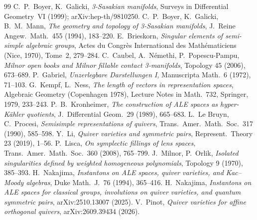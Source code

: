 \documentclass[11pt]{article}
\theoremstyle{definition}
\theoremstyle{remark}
\begin{document}
\begin{thebibliography}{99}
 C.~P.~Boyer, K.~Galicki, \emph{3-Sasakian manifolds}, Surveys in Differential Geometry~VI (1999); arXiv:hep-th/9810250.
 C.~P.~Boyer, K.~Galicki, B.~M.~Mann, \emph{The geometry and topology of 3-Sasakian manifolds}, J.\ Reine Angew.\ Math.\ 455 (1994), 183--220.
 E.~Brieskorn, \emph{Singular elements of semi-simple algebraic groups}, Actes du Congr\`es International des Math\'ematiciens (Nice, 1970), Tome~2, 279--284.
 C.~Caubel, A.~N\'emethi, P.~Popescu-Pampu, \emph{Milnor open books and Milnor fillable contact 3-manifolds}, Topology 45 (2006), 673--689.
 P.~Gabriel, \emph{Unzerlegbare Darstellungen I}, Manuscripta Math.\ 6 (1972), 71--103.
 G.~Kempf, L.~Ness, \emph{The length of vectors in representation spaces}, Algebraic Geometry (Copenhagen 1978), Lecture Notes in Math.\ 732, Springer, 1979, 233--243.
 P.~B.~Kronheimer, \emph{The construction of ALE spaces as hyper-K\"ahler quotients}, J.\ Differential Geom.\ 29 (1989), 665--683.
 L.~Le Bruyn, C.~Procesi, \emph{Semisimple representations of quivers}, Trans.\ Amer.\ Math.\ Soc.\ 317 (1990), 585--598.
 Y.~Li, \emph{Quiver varieties and symmetric pairs}, Represent.\ Theory 23 (2019), 1--56.
 P.~Lisca, \emph{On symplectic fillings of lens spaces}, Trans.\ Amer.\ Math.\ Soc.\ 360 (2008), 765--799.
 J.~Milnor, P.~Orlik, \emph{Isolated singularities defined by weighted homogeneous polynomials}, Topology 9 (1970), 385--393.
 H.~Nakajima, \emph{Instantons on ALE spaces, quiver varieties, and Kac--Moody algebras}, Duke Math.\ J.\ 76 (1994), 365--416.
 H.~Nakajima, \emph{Instantons on ALE spaces for classical groups, involutions on quiver varieties, and quantum symmetric pairs}, arXiv:2510.13007 (2025).
 V.~Pinot, \emph{Quiver varieties for affine orthogonal quivers}, arXiv:2609.39434 (2026).
\end{thebibliography}
\end{document}

